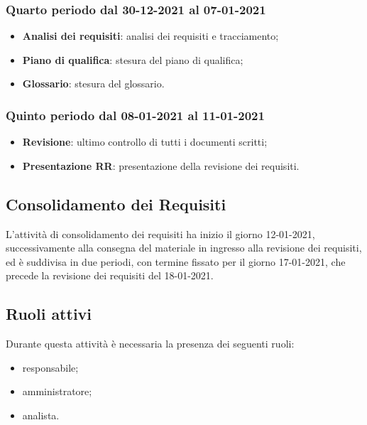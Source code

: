 	\subsubsection{Quarto periodo dal 30-12-2021 al 07-01-2021}
	\begin{itemize}
	\item \textbf{Analisi dei requisiti}: analisi dei requisiti e tracciamento;
	\item \textbf{Piano di qualifica}: stesura del piano di qualifica;
	\item \textbf{Glossario}: stesura del glossario.
	\end{itemize}
	
	\subsubsection{Quinto periodo dal 08-01-2021 al 11-01-2021}
	\begin{itemize}
	\item \textbf{Revisione}: ultimo controllo di tutti i documenti scritti;
	\item \textbf{Presentazione RR}: presentazione della revisione dei requisiti.
	\end{itemize}
	
	
	\newpage
	
	
	\newpage
	
	\subsection{Consolidamento dei Requisiti}
	L’attività di consolidamento dei requisiti ha inizio il giorno 12-01-2021, successivamente alla consegna
	del materiale in ingresso alla revisione dei requisiti, ed è suddivisa in due periodi, con termine fissato
	per il giorno 17-01-2021, che precede la revisione dei requisiti del 18-01-2021.
	
	\subsection{Ruoli attivi}
	Durante questa attività è necessaria la presenza dei seguenti ruoli:
	\begin{itemize}
	\item responsabile;
	\item amministratore;
	\item analista.
	\end{itemize}

